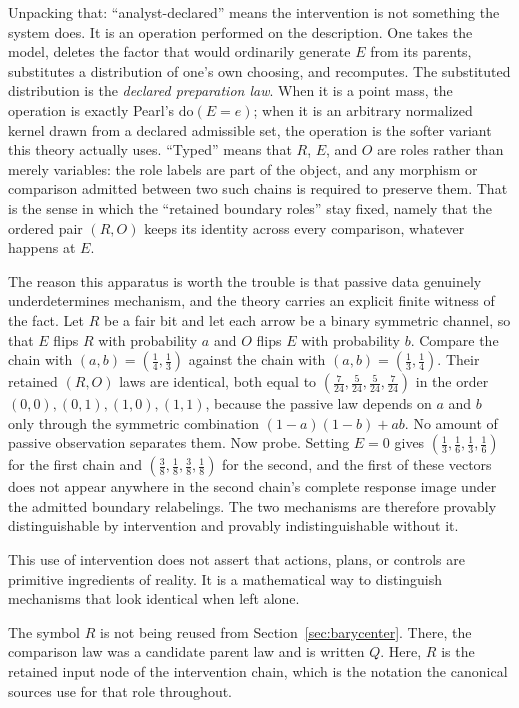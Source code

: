 \documentclass[11pt,letterpaper]{article}
\begin{document}
Unpacking that: ``analyst-declared'' means the intervention is not something the system does. It is an operation performed on the description. One takes the model, deletes the factor that would ordinarily generate \(E\) from its parents, substitutes a distribution of one's own choosing, and recomputes. The substituted distribution is the \emph{declared preparation law}. When it is a point mass, the operation is exactly Pearl's \(\mathrm{do}(E=e)\); when it is an arbitrary normalized kernel drawn from a declared admissible set, the operation is the softer variant this theory actually uses. ``Typed'' means that \(R\), \(E\), and \(O\) are roles rather than merely variables: the role labels are part of the object, and any morphism or comparison admitted between two such chains is required to preserve them. That is the sense in which the ``retained boundary roles'' stay fixed, namely that the ordered pair \((R,O)\) keeps its identity across every comparison, whatever happens at \(E\).

The reason this apparatus is worth the trouble is that passive data genuinely underdetermines mechanism, and the theory carries an explicit finite witness of the fact. Let \(R\) be a fair bit and let each arrow be a binary symmetric channel, so that \(E\) flips \(R\) with probability \(a\) and \(O\) flips \(E\) with probability \(b\). Compare the chain with \((a,b)=(\tfrac14,\tfrac13)\) against the chain with \((a,b)=(\tfrac13,\tfrac14)\). Their retained \((R,O)\) laws are identical, both equal to \((\tfrac{7}{24},\tfrac{5}{24},\tfrac{5}{24},\tfrac{7}{24})\) in the order \((0,0),(0,1),(1,0),(1,1)\), because the passive law depends on \(a\) and \(b\) only through the symmetric combination \((1-a)(1-b)+ab\). No amount of passive observation separates them. Now probe. Setting \(E=0\) gives \((\tfrac13,\tfrac16,\tfrac13,\tfrac16)\) for the first chain and \((\tfrac38,\tfrac18,\tfrac38,\tfrac18)\) for the second, and the first of these vectors does not appear anywhere in the second chain's complete response image under the admitted boundary relabelings. The two mechanisms are therefore provably distinguishable by intervention and provably indistinguishable without it.

This use of intervention does not assert that actions, plans, or controls are primitive ingredients of reality. It is a mathematical way to distinguish mechanisms that look identical when left alone.

\begin{translationbox}
The symbol \(R\) is not being reused from Section~\ref{sec:barycenter}. There, the comparison law was a candidate parent law and is written \(Q\). Here, \(R\) is the retained input node of the intervention chain, which is the notation the canonical sources use for that role throughout.
\end{translationbox}
\end{document}
